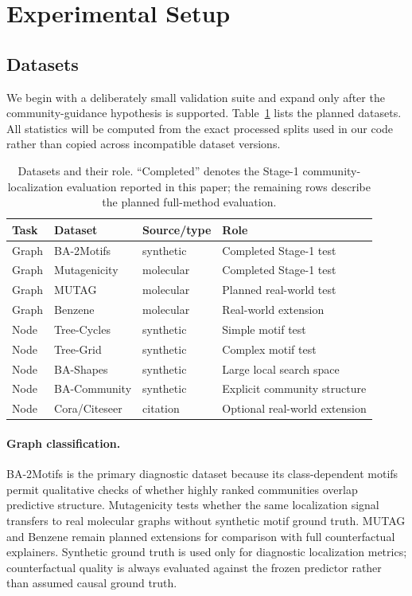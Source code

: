 \documentclass[runningheads]{llncs}
\begin{document}
\section{Experimental Setup}
\label{sec:experiments}

\subsection{Datasets}
We begin with a deliberately small validation suite and expand only after the
community-guidance hypothesis is supported. Table~\ref{tab:datasets} lists the
planned datasets. All statistics will be computed from the exact processed
splits used in our code rather than copied across incompatible dataset
versions.

\begin{table}[t]
\centering
\caption{Datasets and their role. ``Completed'' denotes the Stage-1
community-localization evaluation reported in this paper; the remaining rows
describe the planned full-method evaluation.}
\label{tab:datasets}
\small
\begin{tabular}{llll}
\toprule
Task & Dataset & Source/type & Role \\
\midrule
Graph & BA-2Motifs & synthetic & Completed Stage-1 test \\
Graph & Mutagenicity & molecular & Completed Stage-1 test \\
Graph & MUTAG & molecular & Planned real-world test \\
Graph & Benzene & molecular & Real-world extension \\
\midrule
Node & Tree-Cycles & synthetic & Simple motif test \\
Node & Tree-Grid & synthetic & Complex motif test \\
Node & BA-Shapes & synthetic & Large local search space \\
Node & BA-Community & synthetic & Explicit community structure \\
Node & Cora/Citeseer & citation & Optional real-world extension \\
\bottomrule
\end{tabular}
\end{table}

\paragraph{Graph classification.}
BA-2Motifs is the primary diagnostic dataset because its class-dependent
motifs permit qualitative checks of whether highly ranked communities overlap
predictive structure. Mutagenicity tests whether the same localization signal
transfers to real molecular graphs without synthetic motif ground truth.
MUTAG and Benzene remain planned extensions for comparison with full
counterfactual explainers. Synthetic ground truth is used only for diagnostic
localization metrics; counterfactual quality is always evaluated against the
frozen predictor rather than assumed causal ground truth.
\end{document}
